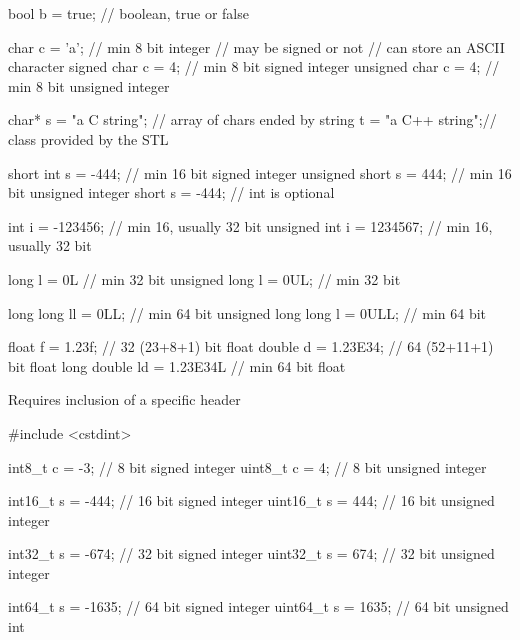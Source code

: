 \begin{frame}[fragile]
  \begin{cppcode}
    bool b = true;            // boolean, true or false

    char c = 'a';             // min 8 bit integer
                              // may be signed or not
                              // can store an ASCII character
    signed char c = 4;        // min 8 bit signed integer
    unsigned char c = 4;      // min 8 bit unsigned integer

    char* s = "a C string";   // array of chars ended by \0
    string t = "a C++ string";// class provided by the STL

    short int s = -444;       // min 16 bit signed integer
    unsigned short s = 444;   // min 16 bit unsigned integer
    short s = -444;           // int is optional
  \end{cppcode}
\end{frame}
\begin{frame}[fragile]
  \begin{cppcode}
    int i = -123456;          // min 16, usually 32 bit
    unsigned int i = 1234567; // min 16, usually 32 bit

    long l = 0L               // min 32 bit
    unsigned long l = 0UL;    // min 32 bit

    long long ll = 0LL;          // min 64 bit
    unsigned long long l = 0ULL; // min 64 bit

    float f = 1.23f;          // 32 (23+8+1) bit float
    double d = 1.23E34;       // 64 (52+11+1) bit float
    long double ld = 1.23E34L // min 64 bit float
  \end{cppcode}
\end{frame}

\begin{frame}[fragile]
  \alert{Requires inclusion of a specific header}
  \begin{cppcode}
    #include <cstdint>

    int8_t c = -3;     // 8 bit signed integer
    uint8_t c = 4;     // 8 bit unsigned integer

    int16_t s = -444;  // 16 bit signed integer
    uint16_t s = 444;  // 16 bit unsigned integer

    int32_t s = -674;  // 32 bit signed integer
    uint32_t s = 674;  // 32 bit unsigned integer

    int64_t s = -1635; // 64 bit signed integer
    uint64_t s = 1635; // 64 bit unsigned int
    \end{cppcode}
\end{frame}

